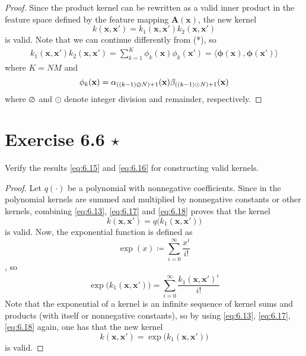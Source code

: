 \begin{proof}
    Since the product kernel can be rewritten as a valid inner product in the 
    feature space defined by the feature mapping $\mathbf{A}(\mathbf{x})$,
    the new kernel
    \begin{equation}\label{eq:6.18}\tag{6.18}
        k(\mathbf{x}, \mathbf{x}')
        = k_1(\mathbf{x}, \mathbf{x}') k_2(\mathbf{x}, \mathbf{x}')
    \end{equation}
    is valid. Note that we can continue differently from (*), so
    \begin{align*}
        k_1(\mathbf{x}, \mathbf{x}') k_2(\mathbf{x}, \mathbf{x}')
        = \sum_{k=1}^{K} \phi_k (\mathbf{x}) \phi_k(\mathbf{x}')
        = \langle \bm{\phi}(\mathbf{x}), \bm{\phi}(\mathbf{x}') \rangle
    \end{align*}
    where $K = NM$ and
    \[
        \phi_k(\mathbf{x}) 
        = \alpha_{((k - 1) \varoslash N) + 1}(\mathbf{x})
        \beta_{((k - 1) \odot N) + 1}(\mathbf{x})
    \] 
    where $\varoslash$ and $\odot$ denote integer division and remainder,
    respectively.
\end{proof}

\section*{Exercise 6.6 $\star$}
Verify the results \eqref{eq:6.15} and \eqref{eq:6.16} for constructing valid kernels.

\vspace{1em}

\begin{proof}
    Let $q(\cdot)$ be a polynomial with nonnegative coefficients. Since in the polynomial
    kernels are summed and multiplied by nonnegative constants or other kernels, combining
    \eqref{eq:6.13}, \eqref{eq:6.17} and \eqref{eq:6.18} proves that
    the kernel
    \begin{equation}\label{eq:6.15}\tag{6.15}
        k(\mathbf{x}, \mathbf{x}') = q\big(k_1(\mathbf{x}, \mathbf{x}')\big)
    \end{equation}
    is valid. Now, the exponential function is defined as
    \[
        \exp(x) \coloneqq \sum_{i=0}^{\infty} \frac{x^i}{i!} 
    \],
    so
    \[
        \exp\big(k_1(\mathbf{x}, \mathbf{x}')\big)
        = \sum_{i=0}^{\infty} \frac{k_1(\mathbf{x}, \mathbf{x}')^i}{i!}
    \] 
    Note that the exponential of a kernel is an infinite sequence of kernel sums
    and products (with itself or nonnegative constants), so by using
    \eqref{eq:6.13}, \eqref{eq:6.17}, \eqref{eq:6.18} again, one has that
    the new kernel
    \begin{equation}\label{eq:6.16}\tag{6.16}
        k(\mathbf{x}, \mathbf{x}') = \exp\big(k_1(\mathbf{x}, \mathbf{x}')\big)
    \end{equation}
    is valid.
\end{proof}

